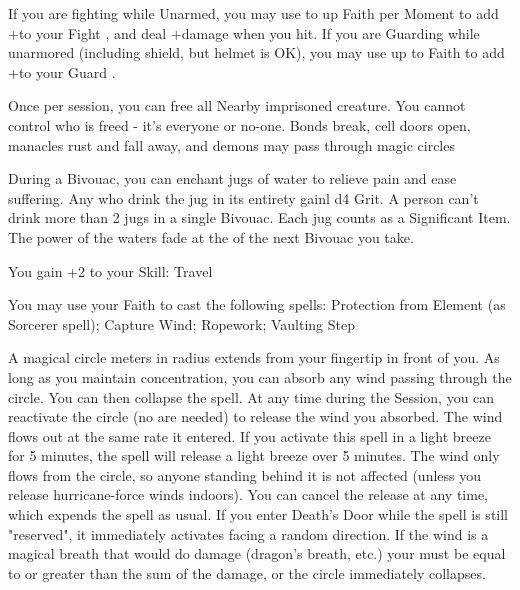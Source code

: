 {

If you are fighting while Unarmed, you may use to up \LVL Faith per Moment to add +\SUMDICE to your Fight \RO, and deal +\DICE damage when you hit.  If you are Guarding while unarmored (including shield, but helmet is OK), you may use up to \LVL Faith to add +\SUMDICE to your Guard \RO.





\GOD[
Name=Issek of the Jug,
Link=small-god-issek of the jug,
GodOf=Seraph of Suffering and Freedom,
Holy=a broken pair of manacles
]


Once per session, you can free all Nearby imprisoned creature. You cannot control who is freed - it's everyone or no-one. Bonds break, cell doors open, manacles rust and fall away, and demons may pass through magic circles


During a Bivouac, you can enchant \DICE jugs of water to relieve pain and ease suffering.  Any who drink the jug in its entirety gainl d4 Grit.  A person can't drink more than 2 jugs in a single Bivouac.  Each jug counts as a Significant Item.  The power of the waters fade at the  of the next Bivouac you take.




\GOD[
Name=Kismet,
Link=small-god-kismet,
GodOf=Arbiter of Journeys,
Holy=a carved walking stick
]


You gain +2 to your Skill: Travel


You may use your Faith to cast the following spells: Protection from Element (as Sorcerer spell); Capture Wind; Ropework; Vaulting Step

\LITURGY [
  Name= Capture Wind,
  Link= kismet-liturgy-capture-wind,
  Paradigm= Elements ,
  Save=  N ,
  Duration= Concentration/Session ,
  Counter=  n/a  ,
  Keywords= None ,
  Target=   Point in front of you
]



A magical circle \DICE meters in radius extends from your fingertip in front of you. As long as you maintain concentration, you can absorb any wind passing through the circle. You can then collapse the spell. 
At any time during the Session, you can reactivate the circle (no \DICE are needed) to release the wind you absorbed.  The wind flows out at the same rate it entered. If you activate this spell in a light breeze for 5 minutes, the spell will release a light breeze over 5 minutes. The wind only flows from the circle, so anyone standing behind it is not affected (unless you release hurricane-force winds indoors). You can cancel the release at any time, which expends the spell as usual. If you enter Death's Door while the spell is still "reserved", it immediately activates facing a random direction.  
If the wind is a magical breath that would do damage (dragon's breath, etc.) your \SUMDICE must be equal to or greater than the sum of the damage, or the circle immediately collapses.  

}
